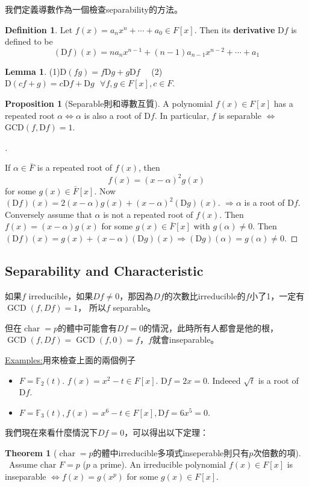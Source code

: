 \documentclass[12pt]{article}
\newcommand{\sfa}{\text{  } \forall}
\theoremstyle{definition}
\newtheorem{thm}{Theorem}
\newcommand{\ex}{\noindent\underline{Examples:}}
\newtheorem{lem}{Lemma}
\newtheorem{dfn}{Definition}
\newtheorem{prop}{Proposition}
\newenvironment{proofs}[1][\proofname]{%
  \begin{proof}[#1]$ $\par\nobreak\ignorespaces
}{%
  \end{proof}
}
\newcommand{\FF}{\mathbb F}
\DeclareMathOperator{\Char}{char}
\DeclareMathOperator{\GCD}{GCD}
\begin{document}
我們定義導數作為一個檢查separability的方法。
\begin{dfn}
	Let $f(x) = a_n x^n + \cdots + a_0 \in F[x]$.
	Then its \textbf{derivative} $\mathrm{D} f$ is defined to be
	\[
		(\mathrm{D} f)(x) = n a_nx^{n - 1} + (n - 1) a_{n - 1}x^{n - 2} + \cdots + a_1
	\]
\end{dfn}

\begin{lem}
	(1)$\mathrm{D}(fg) = f \mathrm{D} g + g \mathrm{D} f\quad$ (2) $\mathrm{D} (cf + g) = c \mathrm{D} f + \mathrm{D} g \sfa f, g \in F[x], c \in F$.
\end{lem}

\begin{prop}[Separable則和導數互質]
	A polynomial $f(x) \in F[x]$ has a repeated root $\alpha \Leftrightarrow \alpha$ is also a root of $\mathrm{D} f$.
	In particular, $f$ is separable $\Leftrightarrow$ $\text{GCD}(f, \mathrm{D} f) = 1$.
\end{prop}

\begin{proofs}
	If $\alpha \in \bar{F}$ is a repeated root of $f(x)$, then
	\[
		f(x) = (x - \alpha)^2 g(x)
	\]
	for some $g(x) \in \bar{F}[x]$.
	Now $(\mathrm{D} f) (x) = 2(x - \alpha) g(x) + (x - \alpha)^2 (\mathrm{D} g)(x)$.
	$\Rightarrow \alpha$ is a root of $\mathrm{D} f$.
	Conversely assume that $\alpha$ is not a repeated root of $f(x)$.
	Then $f(x) = (x - \alpha) g(x)$ for some $g(x) \in \bar{F}[x]$ with $g(\alpha) \neq 0$.
	Then $(\mathrm{D} f)(x) = g(x) + (x - \alpha) (\mathrm{D} g)(x) \Rightarrow (\mathrm{D} g)(\alpha) = g(\alpha) \neq 0$.
\end{proofs}

\subsection{Separability and Characteristic}\label{sep_char}

如果$f$ irreducible，如果$Df\neq 0$，那因為$Df$的次數比irreducible的$f$小了1，一定有$\GCD(f,Df)=1$，
所以$f$ separable。

但在$\Char=p$的體中可能會有$Df=0$的情況，此時所有人都會是他的根，
$\GCD(f,Df)=\GCD(f,0)=f$，$f$就會inseparable。

\ex 用來檢查上面的兩個例子

\begin{itemize}
	\item 	$F = \mathbb{F}_2(t)$. $f(x) = x^2 - t \in F[x]$.
	      $\mathrm{D} f = 2x = 0$.
	      Indeeed $\sqrt{t}$ is a root of $\mathrm{D} f$.
	\item $F = \FF_3(t), f(x)=x^6-t\in F[x], \mathrm{D}f=6x^5=0.$
\end{itemize}
我們現在來看什麼情況下$Df=0$，可以得出以下定理：
\begin{thm}[$\Char=p$的體中irreducible多項式inseperable則只有$p$次倍數的項]\label{charp_irred_sep}
	\ \newline \indent Assume $\text{char } F = p$ ($p$ a prime).
	An irreducible polynomial $f(x) \in F[x]$ is inseparable $\Leftrightarrow f(x) = g(x^p)$ for some $g(x) \in F[x]$.
\end{thm}
\end{document}
